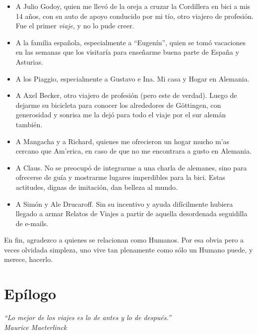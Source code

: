 \documentclass[11pt]{book}
\begin{document}
\begin{itemize}
  \item A Julio Godoy, quien me llev\'o de la oreja a cruzar la Cordillera en
  bici a mis 14 a\~nos, con su auto de apoyo conducido por mi t\'io, otro
  viajero de profesi\'on. Fue el primer \emph{viaje}, y no lo pude creer.
  \item A la familia espa\~nola, especialmente a ``Eugen\'in'', quien se
  tom\'o vacaciones en las semanas que los visitar\'ia para ense\~narme buena
  parte de Espa\~na y Asturias.
  \item A los Piaggio, especialmente a Gustavo e Ina. Mi casa y Hogar en
  Alemania.
  \item A Axel Becker, otro viajero de profesi\'on (pero este de verdad).
  Luego de dejarme su bicicleta para conocer los alrededores de G\"ottingen,
  con generosidad y sonrisa me la dej\'o para todo el viaje por el sur
  alem\'an tambi\'en.
  \item A Mangacha y a Richard, quienes me ofrecieron un hogar mucho m'as
  cercano que Am'erica, en caso de que no me encontrara a gusto en Alemania.
  \item A Claus. No se preocup\'o de integrarme a una charla de alemanes, sino
  para ofrecerse de gu\'ia y mostrarme lugares imperdibles para la bici. Estas
  actitudes, dignas de imitaci\'on, dan belleza al mundo.
  \item A Sim\'on y Ale Drucaroff. Sin su incentivo y ayuda dif\'icilmente
  hubiera llegado a armar Relatos de Viajes a partir de aquella desordenada
  seguidilla de e-mails.
\end{itemize}

En fin, agradezco a quienes se relacionan como Humanos. Por esa obvia pero a
veces olvidada simpleza, uno vive tan plenamente como s\'olo un Humano puede,
y merece, hacerlo.

\newpage
\thispagestyle{empty}

\chapter{Ep\'ilogo}
\begin{flushright}
\item \emph{\small ``Lo mejor de los viajes es lo de antes y lo de
despu\'es.''\\
Maurice Maeterlinck}
\end{flushright}

\end{document}
